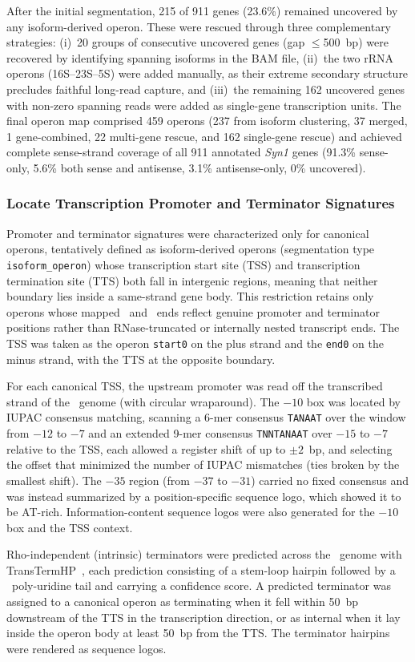 After the initial segmentation, 215 of 911 genes (23.6\%) remained uncovered by any isoform-derived operon.
These were rescued through three complementary strategies: (i)~20 groups of consecutive uncovered genes (gap $\leq$500~bp) were recovered by identifying spanning isoforms in the BAM file, (ii)~the two rRNA operons (16S--23S--5S) were added manually, as their extreme secondary structure precludes faithful long-read capture, and (iii)~the remaining 162 uncovered genes with non-zero spanning reads were added as single-gene transcription units.
The final operon map comprised 459 operons (237 from isoform clustering, 37 merged, 1 gene-combined, 22 multi-gene rescue, and 162 single-gene rescue) and achieved complete sense-strand coverage of all 911 annotated \textit{Syn1} genes (91.3\% sense-only, 5.6\% both sense and antisense, 3.1\% antisense-only, 0\% uncovered).

\subsubsection{Locate Transcription Promoter and Terminator Signatures}
\label{method:operon-TSSTTS}

Promoter and terminator signatures were characterized only for canonical operons, tentatively defined as isoform-derived operons (segmentation type \texttt{isoform\_operon}) whose transcription start site (TSS) and transcription termination site (TTS) both fall in intergenic regions, meaning that neither boundary lies inside a same-strand gene body.
This restriction retains only operons whose mapped \fiveprime\ and \threeprime\ ends reflect genuine promoter and terminator positions rather than RNase-truncated or internally nested transcript ends.
The TSS was taken as the operon \texttt{start0} on the plus strand and the \texttt{end0} on the minus strand, with the TTS at the opposite boundary.

For each canonical TSS, the upstream promoter was read off the transcribed strand of the \syn~genome (with circular wraparound).
The $-10$ box was located by IUPAC consensus matching, scanning a 6-mer consensus \texttt{TANAAT} over the window from $-12$ to $-7$ and an extended 9-mer consensus \texttt{TNNTANAAT} over $-15$ to $-7$ relative to the TSS, each allowed a register shift of up to $\pm 2$~bp, and selecting the offset that minimized the number of IUPAC mismatches (ties broken by the smallest shift).
The $-35$ region (from $-37$ to $-31$) carried no fixed consensus and was instead summarized by a position-specific sequence logo, which showed it to be AT-rich.
Information-content sequence logos were also generated for the $-10$ box and the TSS context.

Rho-independent (intrinsic) terminators were predicted across the \syn~genome with TransTermHP~\cite{kingsford_rapid_2007}, each prediction consisting of a stem-loop hairpin followed by a \threeprime\ poly-uridine tail and carrying a confidence score.
A predicted terminator was assigned to a canonical operon as terminating when it fell within 50~bp downstream of the TTS in the transcription direction, or as internal when it lay inside the operon body at least 50~bp from the TTS.
The terminator hairpins were rendered as sequence logos.
